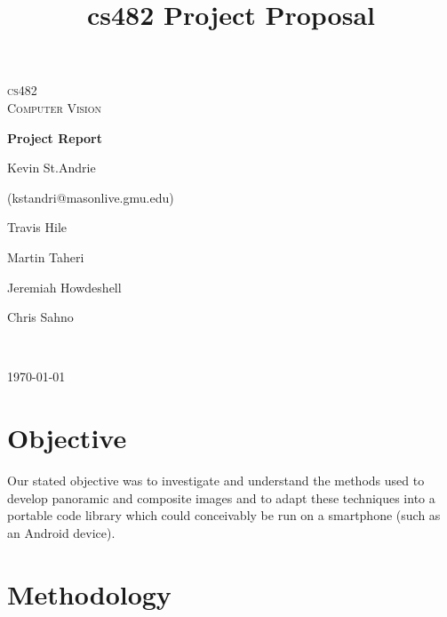 \documentclass[12pt]{amsart}
\title{cs482 Project Proposal}
\begin{document}
\begin{titlepage}
\begin{center}

\textsc{\LARGE cs482\\Computer Vision }\\[1.5cm]


{ 
\Large {\bfseries Project Report}
\small




Kevin St.Andrie

{\footnotesize (kstandri@masonlive.gmu.edu)}

Travis Hile

Martin Taheri

Jeremiah Howdeshell

Chris Sahno }\\[1.5cm]



\vfill

{\large \today}

\end{center}

\end{titlepage}
\fancyfoot{}
\newpage
\setcounter{page}{1}
\fancyhf{}
\fancyhead{} %
\fancyhead[CO,CE]{} 
\fancyhead[LO,RE]{\thepage}
\renewcommand{\headrulewidth}{0.0pt} 
\renewcommand{\footrulewidth}{0.0pt}

\newpage
\thispagestyle{empty}
\mbox{}
\pagebreak

\section{Objective}
Our stated objective was to investigate and understand the methods used to develop panoramic and composite images and to adapt these techniques into a portable code library which could conceivably be run on a smartphone (such as an Android device).

\section{Methodology}
\end{document}
